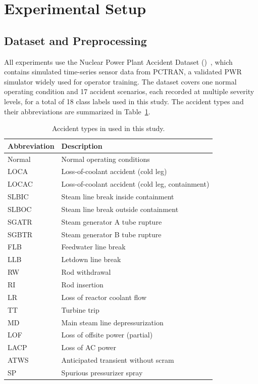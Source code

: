 \section{Experimental Setup}
\label{sec:setup}

\subsection{Dataset and Preprocessing}

All experiments use the Nuclear Power Plant Accident Dataset (\nppad)~\citep{qi2022nppad}, which contains simulated time-series sensor data from PCTRAN, a validated PWR simulator widely used for operator training. The dataset covers one normal operating condition and 17 accident scenarios, each recorded at multiple severity levels, for a total of 18 class labels used in this study. The accident types and their abbreviations are summarized in Table~\ref{tab:accidents}.

\begin{table}[H]
    \centering
    \small
    \caption{Accident types in \nppad{} used in this study.}
    \label{tab:accidents}
    \begin{tabular}{@{}ll@{}}
        \toprule
        Abbreviation & Description \\
        \midrule
        Normal & Normal operating conditions \\
        LOCA & Loss-of-coolant accident (cold leg) \\
        LOCAC & Loss-of-coolant accident (cold leg, containment) \\
        SLBIC & Steam line break inside containment \\
        SLBOC & Steam line break outside containment \\
        SGATR & Steam generator A tube rupture \\
        SGBTR & Steam generator B tube rupture \\
        FLB & Feedwater line break \\
        LLB & Letdown line break \\
        RW & Rod withdrawal \\
        RI & Rod insertion \\
        LR & Loss of reactor coolant flow \\
        TT & Turbine trip \\
        MD & Main steam line depressurization \\
        LOF & Loss of offsite power (partial) \\
        LACP & Loss of AC power \\
        ATWS & Anticipated transient without scram \\
        SP & Spurious pressurizer spray \\
        \bottomrule
    \end{tabular}
\end{table}


